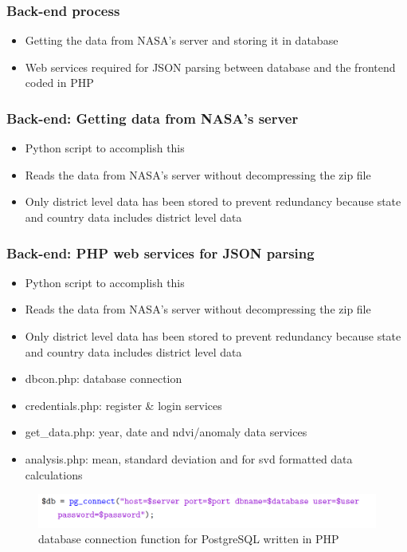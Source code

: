 \begin{frame}
\frametitle{Back-end process}

   \begin{itemize}
       \item Getting the data from NASA's server and storing it in database
       \item Web services required for JSON parsing between database and the frontend coded in PHP
   \end{itemize}
\end{frame}


\begin{frame}
\frametitle{Back-end: Getting data from NASA's server}
\begin{itemize}
    \item Python script to accomplish this
    \item Reads the data from NASA's server without decompressing the zip file
    \item Only district level data has been stored to prevent redundancy because state and country data includes district level data
\end{itemize}
\end{frame}



\begin{frame}
\frametitle{Back-end: PHP web services for JSON parsing}
\begin{itemize}
    \item Python script to accomplish this
    \item Reads the data from NASA's server without decompressing the zip file
    \item Only district level data has been stored to prevent redundancy because state and country data includes district level data
\end{itemize}

\begin{itemize}
    \item dbcon.php: database connection
    \item credentials.php: register \& login services
    \item get\_data.php: year, date and ndvi/anomaly data services
    \item analysis.php: mean, standard deviation and for svd formatted data calculations
\end{itemize}

\begin{figure}
    \centering
    \begin{minipage}{.5\columnwidth}
    \includegraphics[width=1.0\linewidth]{final/figures/php_dbcon.png}
    \caption{database connection function for PostgreSQL written in PHP}
    \end{minipage}
\end{figure}
\end{frame}


